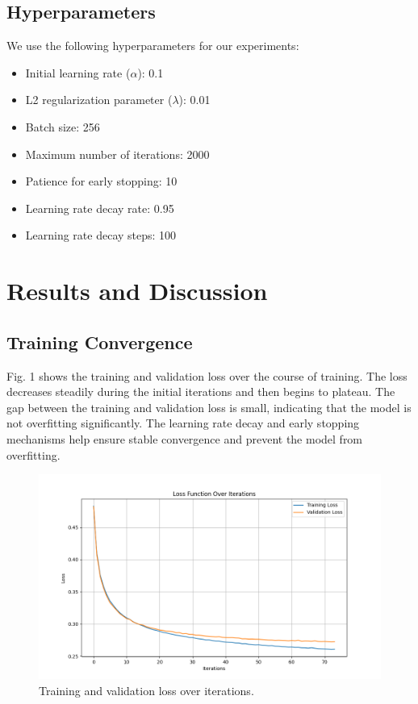 \documentclass[10pt,journal,compsoc]{IEEEtran}
\begin{document}
\subsection{Hyperparameters}
We use the following hyperparameters for our experiments:
\begin{itemize}
    \item Initial learning rate ($\alpha$): 0.1
    \item L2 regularization parameter ($\lambda$): 0.01
    \item Batch size: 256
    \item Maximum number of iterations: 2000
    \item Patience for early stopping: 10
    \item Learning rate decay rate: 0.95
    \item Learning rate decay steps: 100
\end{itemize}

\section{Results and Discussion}
\subsection{Training Convergence}
Fig. 1 shows the training and validation loss over the course of training. The loss decreases steadily during the initial iterations and then begins to plateau. The gap between the training and validation loss is small, indicating that the model is not overfitting significantly. The learning rate decay and early stopping mechanisms help ensure stable convergence and prevent the model from overfitting.

\begin{figure}[htbp]
\centering
\includegraphics[width=0.8\linewidth]{img/lossfunction.png}
\caption{Training and validation loss over iterations.}
\label{fig:loss_curve}
\end{figure}
\end{document}
